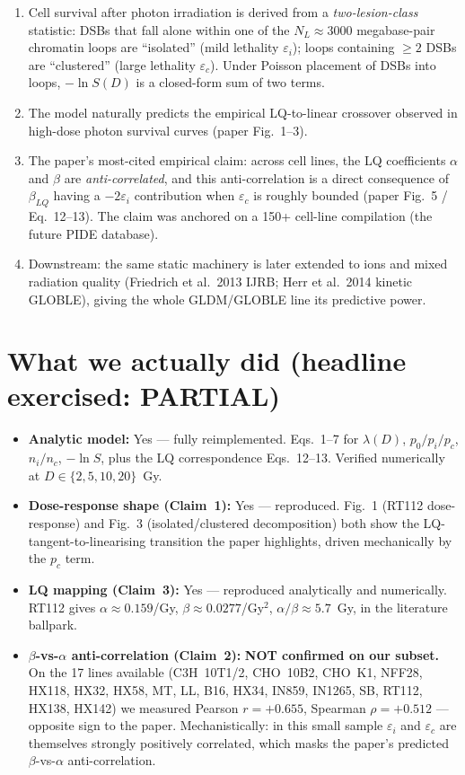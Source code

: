 \documentclass[11pt]{article}
\begin{document}
\begin{enumerate}
\item Cell survival after photon irradiation is derived from a
\emph{two-lesion-class} statistic: DSBs that fall alone within one of the
$N_L \approx 3000$ megabase-pair chromatin loops are ``isolated'' (mild
lethality $\varepsilon_i$); loops containing $\geq 2$ DSBs are ``clustered''
(large lethality $\varepsilon_c$). Under Poisson placement of DSBs into loops,
$-\ln S(D)$ is a closed-form sum of two terms.
\item The model naturally predicts the empirical LQ-to-linear crossover
observed in high-dose photon survival curves (paper Fig.~1--3).
\item The paper's most-cited empirical claim: across cell lines, the
LQ coefficients $\alpha$ and $\beta$ are \emph{anti-correlated}, and this
anti-correlation is a direct consequence of $\beta_{LQ}$ having a
$-2\varepsilon_i$ contribution when $\varepsilon_c$ is roughly bounded
(paper Fig.~5 / Eq.~12--13). The claim was anchored on a 150+ cell-line
compilation (the future PIDE database).
\item Downstream: the same static machinery is later extended to ions and
mixed radiation quality (Friedrich et al.\ 2013 IJRB; Herr et al.\ 2014
kinetic GLOBLE), giving the whole GLDM/GLOBLE line its predictive power.
\end{enumerate}

\section{What we actually did (headline exercised: PARTIAL)}

\begin{itemize}
\item \textbf{Analytic model:} Yes --- fully reimplemented. Eqs.~1--7 for
$\lambda(D)$, $p_0/p_i/p_c$, $n_i/n_c$, $-\ln S$, plus the LQ correspondence
Eqs.~12--13. Verified numerically at $D \in \{2,5,10,20\}$~Gy.
\item \textbf{Dose-response shape (Claim~1):} Yes --- reproduced. Fig.~1
(RT112 dose-response) and Fig.~3 (isolated/clustered decomposition) both
show the LQ-tangent-to-linearising transition the paper highlights, driven
mechanically by the $p_c$ term.
\item \textbf{LQ mapping (Claim~3):} Yes --- reproduced analytically and
numerically. RT112 gives $\alpha \approx 0.159$/Gy, $\beta \approx 0.0277$/Gy$^2$,
$\alpha/\beta \approx 5.7$~Gy, in the literature ballpark.
\item \textbf{$\beta$-vs-$\alpha$ anti-correlation (Claim~2):}
\textbf{NOT confirmed on our subset.} On the 17 lines available
(C3H~10T1/2, CHO~10B2, CHO~K1, NFF28, HX118, HX32, HX58, MT, LL, B16, HX34,
IN859, IN1265, SB, RT112, HX138, HX142) we measured Pearson $r=+0.655$,
Spearman $\rho=+0.512$ --- opposite sign to the paper. Mechanistically:
in this small sample $\varepsilon_i$ and $\varepsilon_c$ are themselves
strongly positively correlated, which masks the paper's predicted
$\beta$-vs-$\alpha$ anti-correlation.
\end{itemize}
\end{document}
